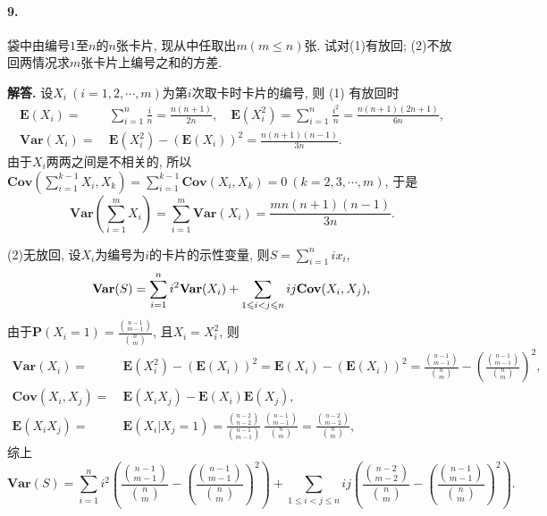 \documentclass[12pt, a4paper, oneside]{ctexart}
\newenvironment{solution}{\par\noindent\textbf{解答. }}{\bigskip\par}
\let\leq=\leqslant %
\def\P{\textbf{P}}      %
\def\E{\textbf{E}}      %
\def\var{\textbf{Var}}  %
\def\cov{\textbf{Cov}}  %
\begin{document}
\paragraph{9.}袋中由编号$1$至$n$的$n$张卡片, 现从中任取出$m(m\leq n)$张. 试对(1)有放回; (2)不放回两情况求$m$张卡片上编号之和的方差.
\begin{solution}
    设$X_i\ (i=1,2,\cdots, m)$为第$i$次取卡时卡片的编号, 则
    (1) 有放回时
    \begin{align*}
        \E(X_i) =&\ \sum_{i=1}^n\frac{i}{n} = \frac{n(n+1)}{2n},\quad \E(X_i^2) = \sum_{i=1}^n\frac{i^2}{n} = \frac{n(n+1)(2n+1)}{6n},\\
        \var(X_i) =&\ \E(X_i^2) - (\E(X_i))^2 = \frac{n(n+1)(n-1)}{3n}.
    \end{align*}
    由于$X_i$两两之间是不相关的, 所以$\cov\left(\sum_{i=1}^{k-1}X_i, X_k\right) = \sum_{i=1}^{k-1}\cov(X_i, X_k) = 0\ (k=2, 3,\cdots, m)$, 于是
    \begin{equation*}
        \var(\sum_{i=1}^m X_i) = \sum_{i=1}^m\var(X_i) = \frac{mn(n+1)(n-1)}{3n}.
    \end{equation*}

    (2)无放回, 设$X_i$为编号为$i$的卡片的示性变量, 则$S = \sum_{i=1}^n ix_i$, 
    \begin{equation*}
        \var(S) = \sum_{i=1}^ni^2\var(X_i) +\sum_{1\leq i < j\leq n}ij\cov(X_i, X_j),\\
    \end{equation*}
    由于$\P(X_i = 1)=\frac{\binom{n-1}{m-1}}{\binom{n}{m}}$, 且$X_i = X_i^2$, 则
    \begin{align*}
        \var(X_i) =&\ \E(X_i^2)-(\E(X_i))^2 = \E(X_i) - (\E(X_i))^2 = \frac{\binom{n-1}{m-1}}{\binom{n}{m}}-\left(\frac{\binom{n-1}{m-1}}{\binom{n}{m}}\right)^2,\\
        \cov(X_i,X_j) =&\ \E(X_iX_j)-\E(X_i)\E(X_j),\\
        \E(X_iX_j) =&\ \E(X_i|X_j=1) = \frac{\binom{n-2}{n-2}}{\binom{n-1}{m-1}}\,\frac{\binom{n-1}{m-1}}{\binom{n}{m}}=\frac{\binom{n-2}{m-2}}{\binom{n}{m}},
    \end{align*}
    综上
    \begin{equation*}
        \var(S) = \sum_{i=1}^ni^2\left(\frac{\binom{n-1}{m-1}}{\binom{n}{m}}-\left(\frac{\binom{n-1}{m-1}}{\binom{n}{m}}\right)^2\right)+\sum_{1\leq i<j\leq n}ij\left(\frac{\binom{n-2}{m-2}}{\binom{n}{m}}-\left(\frac{\binom{n-1}{m-1}}{\binom{n}{m}}\right)^2\right).
    \end{equation*}
\end{solution}
\end{document}
